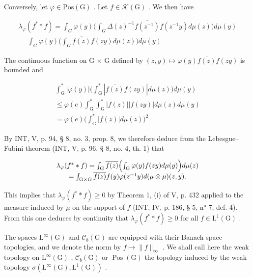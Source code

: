 Conversely, let \(\varphi\in\mathrm{Pos}(\mathrm{G})\) . Let \(f\in\mathcal{K}(\mathrm{G})\) . We then have

\[
\begin{array}{c} \lambda_ {\varphi} (f ^ {*} * f) = \int_ {G} \varphi (y) \Big (\int_ {G} \Delta (z) ^ {- 1} \overline {{f (z ^ {- 1})}} f (z ^ {- 1} y) d \mu (z) \Big) d \mu (y) \\ = \int_ {G} \varphi (y) \Big (\int_ {G} \overline {{f (z)}} f (z y) d \mu (z) \Big) d \mu (y) \end{array}
\]

The continuous function on G × G defined by \((z, y) \mapsto \varphi(y)\overline{f(z)}f(zy)\) is bounded and

\[
\begin{array}{c} \int_ {\mathrm{G}} ^ {*} | \varphi (y) | \Big (\int_ {\mathrm{G}} ^ {*} | \overline {{f (z)}} f (z y) | d \mu (z) \Big) d \mu (y) \\ \leqslant \varphi (e) \int_ {\mathrm{G}} ^ {*} \int_ {\mathrm{G}} ^ {*} | f (z) | | f (z y) | d \mu (z) d \mu (y) \\ = \varphi (e) \Big (\int_ {\mathrm{G}} ^ {*} | f (z) | d \mu (z) \Big) ^ {2} \end{array}
\]

By INT, V, p. 94, § 8, no. 3, prop. 8, we therefore deduce from the Lebesgue–Fubini theorem (INT, V, p. 96, § 8, no. 4, th. 1) that

\[
\begin{array}{c} \lambda_ {\varphi} (f ^ {*} * f) = \int_ {\mathrm{G}} \overline {{f (z)}} \Bigl (\int_ {\mathrm{G}} \varphi (y) f (z y) d \mu (y) \Bigr) d \mu (z) \\ = \int_ {\mathrm{G} \times \mathrm{G}} \overline {{f (z)}} f (y) \varphi (z ^ {- 1} y) d (\mu \otimes \mu) (z, y). \end{array}
\]

This implies that \(\lambda_{\varphi}(f^{*} * f) \geqslant 0\) by Theorem 1, (i) of V, p. 432 applied to the measure induced by \(\mu\) on the support of \(f\) (INT, IV, p. 186, § 5, n° 7, def. 4). From this one deduces by continuity that \(\lambda_{\varphi}(f^{*} * f) \geqslant 0\) for all \(f \in \mathrm{L}^1(\mathrm{G})\) .

The spaces \(\mathrm{L}^{\infty}(\mathrm{G})\) and \(\mathcal{C}_{b}(\mathrm{G})\) are equipped with their Banach space topologies, and we denote the norm by \(f \mapsto \|f\|_{\infty}\) . We shall call here the weak topology on \(\mathrm{L}^{\infty}(\mathrm{G})\) , \(\mathcal{C}_{b}(\mathrm{G})\) or \(\operatorname{Pos}(\mathrm{G})\) the topology induced by the weak topology \(\sigma(\mathrm{L}^{\infty}(\mathrm{G}), \mathrm{L}^{1}(\mathrm{G}))\) .

